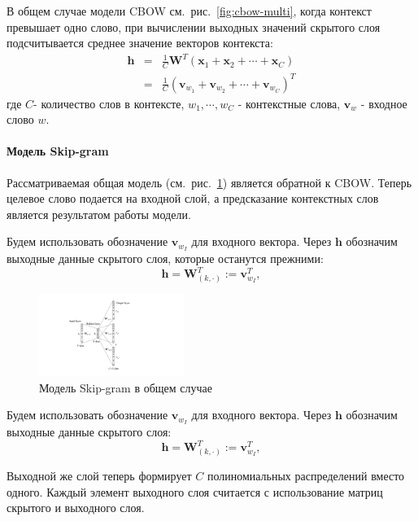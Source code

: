 В общем случае модели CBOW см.~рис.~\ref{fig:cbow-multi}, когда контекст превышает одно слово, при вычислении выходных значений скрытого слоя подсчитывается среднее значение векторов контекста:
\begin{eqnarray}
\mathbf{h} &=& \frac{1}{C}\mathbf{W}^T(\mathbf{x}_1+\mathbf{x}_2+\cdots+\mathbf{x}_C) \\
&=& \frac{1}{C}(\mathbf{v}_{w_1} + \mathbf{v}_{w_2} + \cdots + \mathbf{v}_{w_C})^T
\label{eq:cbow-complex-h}
\end{eqnarray}
где $C$- количество слов в контексте, $w_1, \cdots, w_C$ - контекстные слова, $\mathbf{v}_w$  - входное слово $w$.



\paragraph{Модель Skip-gram}

Рассматриваемая общая модель (см.~рис.~\ref{fig:skip-gram-multi}) является обратной к CBOW. Теперь целевое слово подается на входной слой, а предсказание контекстных слов является результатом работы модели. 

Будем использовать обозначение $\mathbf{v}_{w_I}$ для входного вектора. Через $\mathbf{h}$ обозначим выходные данные скрытого слоя, которые останутся прежними:
\begin{equation}
\mathbf{h} = \mathbf{W}_{(k, \cdot)}^T := \mathbf{v}_{w_I}^T,
\end{equation}

\begin{figure}[t]
\centering
\includegraphics[width=0.42\textwidth]{img/skip-gram-multi.pdf}
\caption{\label{fig:skip-gram-multi} Модель Skip-gram в общем случае}
\end{figure}

Будем использовать обозначение  $\mathbf{v}_{w_I}$ для входного вектора. Через $\mathbf{h}$ обозначим выходные данные скрытого слоя:
\begin{equation}
\mathbf{h} = \mathbf{W}_{(k, \cdot)}^T := \mathbf{v}_{w_I}^T,
\end{equation}

Выходной же слой теперь формирует $C$ полиномиальных распределений вместо одного. Каждый элемент выходного слоя считается с использование матриц скрытого и выходного слоя.

